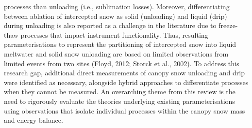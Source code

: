 \documentclass[
  letterpaper,
]{tex/uofsthesis-cs}
\begin{document}
processes than unloading (i.e., sublimation losses). Moreover,
differentiating between ablation of intercepted snow as solid
(unloading) and liquid (drip) during unloading is also reported as a
challenge in the literature due to freeze-thaw processes that impact
instrument functionality. Thus, resulting parameterisations to represent
the partitioning of intercepted snow into liquid meltwater and solid
snow unloading are based on limited observations from limited events
from two sites (Floyd, 2012; Storck et al., 2002). To address this
research gap, additional direct measurements of canopy snow unloading
and drip were identified as necessary, alongside hybrid approaches to
differentiate processes when they cannot be measured. An overarching
theme from this review is the need to rigorously evaluate the theories
underlying existing parameterisations using observations that isolate
individual processes within the canopy snow mass and energy balance.
\end{document}
